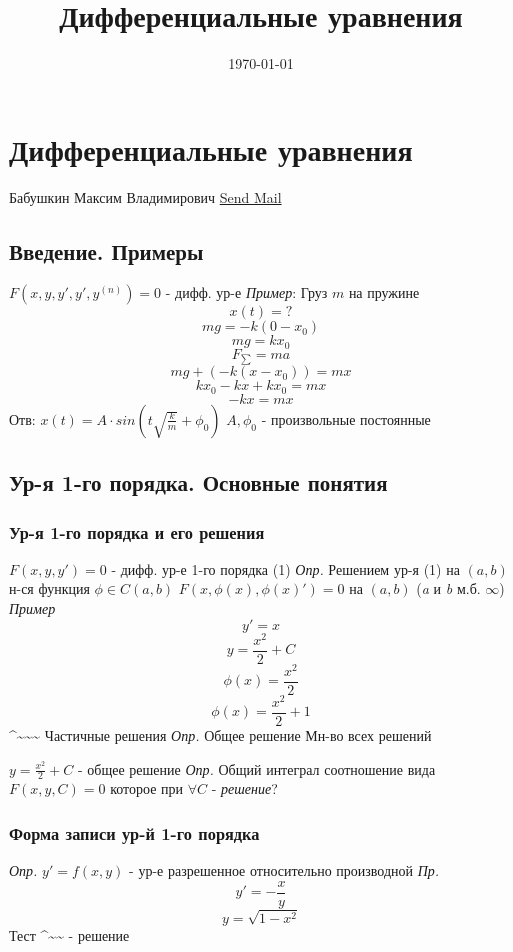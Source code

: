 \documentclass[11pt]{article}
\date{\today}
\title{Дифференциальные уравнения}
\begin{document}
\maketitle
\tableofcontents


\section{Дифференциальные уравнения}
\label{sec:orgc01122d}
Бабушкин Максим Владимирович
\href{mailto:mvbabushkin@itmo.ru}{Send Mail}
\subsection{Введение. Примеры}
\label{sec:org3b1e17e}
\(F(x, y, y', y', y^{(n)}) = 0\) - дифф. ур-е
\emph{Пример}:
Груз \(m\) на пружине
\[x(t) = ?\]
\[mg = -k(0 - x_0)\]
\[mg = kx_0\]
\[F_{\sum} = ma\]
\[mg + (-k(x - x_0)) = mx\]
\[kx_0 - kx + kx_0 = mx\]
\[-kx = mx\]
Отв: \(x(t) = A \cdot sin(t \sqrt{\frac{k}{m}} + \phi_0)\)
\(A, \phi_0\) - произвольные постоянные
\subsection{Ур-я 1-го порядка. Основные понятия}
\label{sec:org1ef285b}
\subsubsection{Ур-я 1-го порядка и его решения}
\label{sec:org34788a9}
\(F(x, y, y') = 0\) - дифф. ур-е 1-го порядка (1)
\emph{Опр.} Решением ур-я (1) на \((a, b)\)
н-ся функция \(\phi \in C(a,b)\)
\(F(x, \phi(x), \phi(x)') = 0\) на \((a, b)\)
(\emph{a} и \emph{b} м.б. \(\infty\)) 
\emph{Пример} 
\[y' = x\]
\[y = \frac{x^2}{2} + C\]
\[\phi(x) = \frac{x^2}{2}\]
\[\phi(x) = \frac{x^2}{2} + 1\]
\^{}\textasciitilde{}\textasciitilde{}\textasciitilde{} Частичные решения
\emph{Опр.} Общее решение 
Мн-во всех решений

\(y = \frac{x^2}{2} + C\) - общее решение
\emph{Опр.} Общий интеграл
соотношение вида \(F(x, y, C) = 0\) которое при \(\forall C\) - \emph{решение}?

\subsubsection{Форма записи ур-й 1-го порядка}
\label{sec:org8ad80de}
\emph{Опр.} \(y' = f(x, y)\) - ур-е разрешенное относительно производной
\emph{Пр.} 
\[y' = -\frac{x}{y}\]
\[y = \sqrt{1 - x^2}\]
Тест
\^{}\textasciitilde{}\textasciitilde{} - решение
\end{document}
